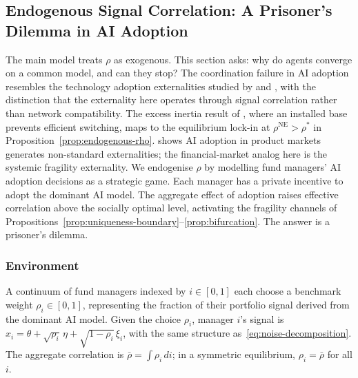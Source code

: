 \label{sec:extensions}

\subsection{Endogenous Signal Correlation: A Prisoner's Dilemma in AI Adoption}

The main model treats $\rho$ as exogenous. This section asks: why do agents converge on a common model, and can they stop? The coordination failure in AI adoption resembles the technology adoption externalities studied by \citet{katz1985} and \citet{farrell1985}, with the distinction that the externality here operates through signal correlation rather than network compatibility. The excess inertia result of \citet{farrell1985}, where an installed base prevents efficient switching, maps to the equilibrium lock-in at $\rho^{\text{NE}} > \rho^*$ in Proposition~\ref{prop:endogenous-rho}. \citet{gans2023} shows AI adoption in product markets generates non-standard externalities; the financial-market analog here is the systemic fragility externality. We endogenise $\rho$ by modelling fund managers' AI adoption decisions as a strategic game. Each manager has a private incentive to adopt the dominant AI model. The aggregate effect of adoption raises effective correlation above the socially optimal level, activating the fragility channels of Propositions~\ref{prop:uniqueness-boundary}--\ref{prop:bifurcation}. The answer is a prisoner's dilemma.

\subsubsection{Environment}

A continuum of fund managers indexed by $i \in [0,1]$ each choose a benchmark weight $\rho_i \in [0,1]$, representing the fraction of their portfolio signal derived from the dominant AI model. Given the choice $\rho_i$, manager $i$'s signal is $x_i = \theta + \sqrt{\rho_i}\,\eta + \sqrt{1-\rho_i}\,\xi_i$, with the same structure as~\eqref{eq:noise-decomposition}. The aggregate correlation is $\bar{\rho} = \int \rho_i \, di$; in a symmetric equilibrium, $\rho_i = \bar{\rho}$ for all $i$.

